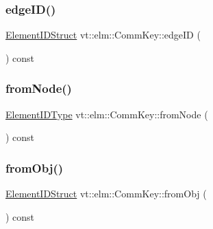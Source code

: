 \subsubsection{\texorpdfstring{edge\+I\+D()}{edgeID()}}
{\footnotesize\ttfamily \hyperlink{structvt_1_1elm_1_1_element_i_d_struct}{Element\+I\+D\+Struct} vt\+::elm\+::\+Comm\+Key\+::edge\+ID (\begin{DoxyParamCaption}{ }\end{DoxyParamCaption}) const\hspace{0.3cm}{\ttfamily [inline]}}

\mbox{\label{structvt_1_1elm_1_1_comm_key_a0ca4110f2eec16b09cbb1201c3e094e6}} 
\subsubsection{\texorpdfstring{from\+Node()}{fromNode()}}
{\footnotesize\ttfamily \hyperlink{namespacevt_1_1elm_a63afb64985b41b7b6dcf2f01336391f8}{Element\+I\+D\+Type} vt\+::elm\+::\+Comm\+Key\+::from\+Node (\begin{DoxyParamCaption}{ }\end{DoxyParamCaption}) const\hspace{0.3cm}{\ttfamily [inline]}}

\mbox{\label{structvt_1_1elm_1_1_comm_key_a75f1afcaf2349cdc7de7bf8586ba8832}} 
\subsubsection{\texorpdfstring{from\+Obj()}{fromObj()}}
{\footnotesize\ttfamily \hyperlink{structvt_1_1elm_1_1_element_i_d_struct}{Element\+I\+D\+Struct} vt\+::elm\+::\+Comm\+Key\+::from\+Obj (\begin{DoxyParamCaption}{ }\end{DoxyParamCaption}) const\hspace{0.3cm}{\ttfamily [inline]}}

\mbox{\label{structvt_1_1elm_1_1_comm_key_a52b50e35388e05418d9288ee3233659e}} 
